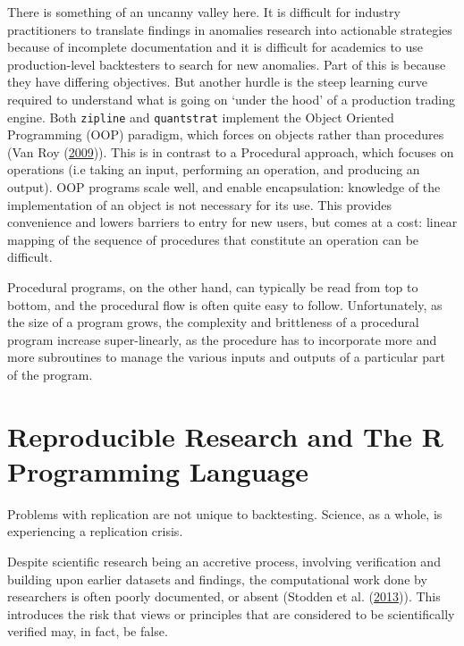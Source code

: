 \documentclass[11pt,preprint, authoryear]{elsarticle}
\numberwithin{equation}{section}
\numberwithin{figure}{section}
\numberwithin{table}{section}
\begin{document}
There is something of an uncanny valley here. It is difficult for
industry practitioners to translate findings in anomalies research into
actionable strategies because of incomplete documentation and it is
difficult for academics to use production-level backtesters to search
for new anomalies. Part of this is because they have differing
objectives. But another hurdle is the steep learning curve required to
understand what is going on `under the hood' of a production trading
engine. Both \texttt{zipline} and \texttt{quantstrat} implement the
Object Oriented Programming (OOP) paradigm, which forces on objects
rather than procedures (Van Roy
(\protect\hyperlink{ref-VanRoy2009}{2009})). This is in contrast to a
Procedural approach, which focuses on operations (i.e taking an input,
performing an operation, and producing an output). OOP programs scale
well, and enable encapsulation: knowledge of the implementation of an
object is not necessary for its use. This provides convenience and
lowers barriers to entry for new users, but comes at a cost: linear
mapping of the sequence of procedures that constitute an operation can
be difficult.

Procedural programs, on the other hand, can typically be read from top
to bottom, and the procedural flow is often quite easy to follow.
Unfortunately, as the size of a program grows, the complexity and
brittleness of a procedural program increase super-linearly, as the
procedure has to incorporate more and more subroutines to manage the
various inputs and outputs of a particular part of the program.

\pagebreak

\section{\texorpdfstring{Reproducible Research and The R Programming
Language\label{Reproducible Research}}{Reproducible Research and The R Programming Language}}\label{reproducible-research-and-the-r-programming-language}

Problems with replication are not unique to backtesting. Science, as a
whole, is experiencing a replication crisis.

Despite scientific research being an accretive process, involving
verification and building upon earlier datasets and findings, the
computational work done by researchers is often poorly documented, or
absent (Stodden et al. (\protect\hyperlink{ref-Stodden2013}{2013})).
This introduces the risk that views or principles that are considered to
be scientifically verified may, in fact, be false.
\end{document}
